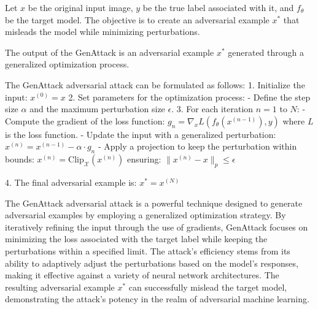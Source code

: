Let $x$ be the original input image, $y$ be the true label associated with it, and $f_{\theta}$ be the target model. The objective is to create an adversarial example $x^*$ that misleads the model while minimizing perturbations.

The output of the GenAttack is an adversarial example $x^*$ generated through a generalized optimization process.

The GenAttack adversarial attack can be formulated as follows:
1. Initialize the input:
   $x^{(0)} = x$
2. Set parameters for the optimization process:
   - Define the step size $\alpha$ and the maximum perturbation size $\epsilon$.
3. For each iteration $n = 1$ to $N$:
   - Compute the gradient of the loss function:
   $g_n = \nabla_x L(f_{\theta}(x^{(n-1)}), y)$
   where $L$ is the loss function.
   - Update the input with a generalized perturbation:
   $x^{(n)} = x^{(n-1)} - \alpha \cdot g_n$
   - Apply a projection to keep the perturbation within bounds:
   $x^{(n)} = \text{Clip}_{\mathcal{X}}(x^{(n)})$
   ensuring:
   $\|x^{(n)} - x\|_p \leq \epsilon$

4. The final adversarial example is:
   $x^* = x^{(N)}$

The GenAttack adversarial attack is a powerful technique designed to generate adversarial examples by employing a generalized optimization strategy. By iteratively refining the input through the use of gradients, GenAttack focuses on minimizing the loss associated with the target label while keeping the perturbations within a specified limit. The attack's efficiency stems from its ability to adaptively adjust the perturbations based on the model's responses, making it effective against a variety of neural network architectures. The resulting adversarial example $x^*$ can successfully mislead the target model, demonstrating the attack's potency in the realm of adversarial machine learning.
